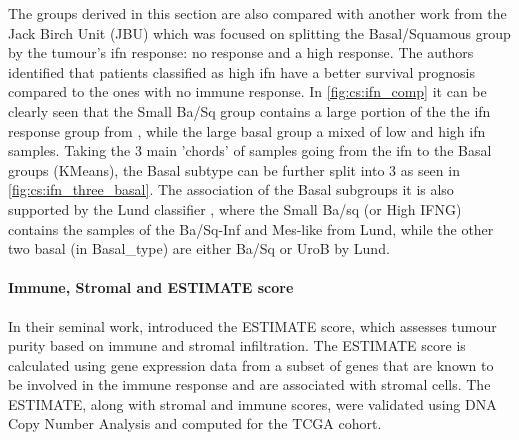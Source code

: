 The groups derived in this section are also compared with another work \citet{Baker2022-bj} from the Jack Birch Unit (JBU) which was focused on splitting the Basal/Squamous group by the tumour's \acrfull{ifn} response: no response and a high response. The authors identified that patients classified as high \acrshort{ifn} have a better survival prognosis compared to the ones with no immune response. In \cref{fig:cs:ifn_comp} it can be clearly seen that the Small Ba/Sq group contains a large portion of the the \acrshort{ifn} response group from \citet{Baker2022-bj}, while the large basal group a mixed of low and high \acrshort{ifn} samples. Taking the 3 main 'chords' of samples going from the \acrshort{ifn} to the Basal groups (KMeans), the Basal subtype can be further split into 3 as seen in \cref{fig:cs:ifn_three_basal}. The association of the Basal subgroups it is also supported by the Lund classifier \citet{Marzouka2018-ge}, where the Small Ba/sq (or High IFNG) contains the samples of the Ba/Sq-Inf and Mes-like from Lund, while the other two basal (in Basal\_type) are either Ba/Sq or UroB by Lund.

\paragraph*{Immune, Stromal and ESTIMATE score}

In their seminal work, \citet{Yoshihara2013-wq} introduced the ESTIMATE score, which assesses tumour purity based on immune and stromal infiltration. The ESTIMATE score is calculated using gene expression data from a subset of genes that are known to be involved in the immune response and are associated with stromal cells. The ESTIMATE, along with stromal and immune scores, were validated using DNA Copy Number Analysis and computed for the TCGA cohort.

